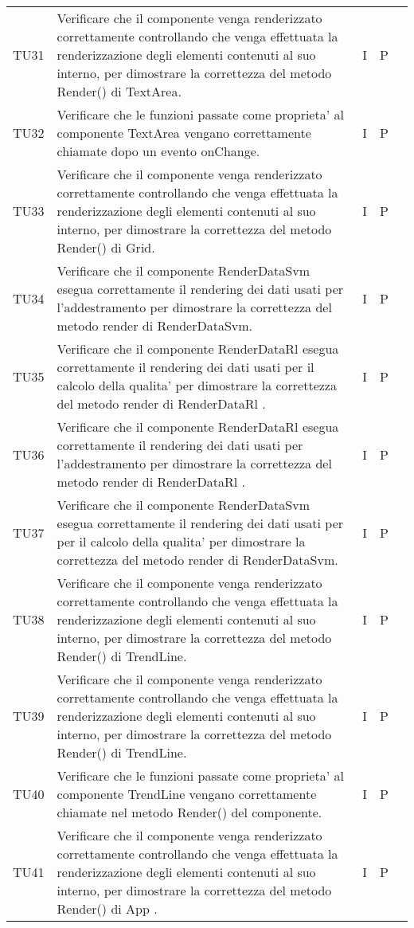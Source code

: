 \begin{longtable} {
		>{}p{15mm} 
		>{}p{79.5mm}
		>{}p{15mm} 
		>{}p{15mm}
		>{}p{0mm}}
	TU31		& Verificare che il componente venga renderizzato correttamente controllando che venga effettuata la renderizzazione degli elementi contenuti al suo interno, per dimostrare la correttezza del metodo Render() di  TextArea.& I & P &\TBstrut \\ [2mm]	
	TU32		& Verificare che le funzioni passate come proprieta' al componente TextArea vengano correttamente chiamate dopo un evento onChange.& I & P &\TBstrut \\ [2mm]	
	TU33		& Verificare che il componente venga renderizzato correttamente controllando che venga effettuata la renderizzazione degli elementi contenuti al suo interno, per dimostrare la correttezza del metodo Render() di  Grid.& I & P &\TBstrut \\ [2mm]	
	TU34		& Verificare che il componente RenderDataSvm esegua correttamente il rendering dei dati usati per l'addestramento per dimostrare la correttezza del metodo render di RenderDataSvm.& I & P &\TBstrut \\ [2mm]
	TU35		& Verificare che il componente RenderDataRl esegua correttamente il rendering dei dati usati per il calcolo della qualita' per dimostrare la correttezza del metodo render di RenderDataRl .& I & P &\TBstrut \\ [2mm]
	TU36		& Verificare che il componente RenderDataRl esegua correttamente il rendering dei dati usati per l'addestramento per dimostrare la correttezza del metodo render di RenderDataRl .& I & P &\TBstrut \\ [2mm]
	TU37		& Verificare che il componente RenderDataSvm esegua correttamente il rendering dei dati usati per per il calcolo della qualita' per dimostrare la correttezza del metodo render di RenderDataSvm.& I & P &\TBstrut \\ [2mm]
	TU38		& Verificare che il componente venga renderizzato correttamente controllando che venga effettuata la renderizzazione degli elementi contenuti al suo interno, per dimostrare la correttezza del metodo Render() di  TrendLine.& I & P &\TBstrut \\ [2mm]
	TU39		& Verificare che il componente venga renderizzato correttamente controllando che venga effettuata la renderizzazione degli elementi contenuti al suo interno, per dimostrare la correttezza del metodo Render() di  TrendLine.& I & P &\TBstrut \\ [2mm]
	TU40		& Verificare che le funzioni passate come proprieta' al componente TrendLine vengano correttamente chiamate nel metodo Render() del componente.& I & P &\TBstrut \\ [2mm]
	TU41		& Verificare che il componente venga renderizzato correttamente controllando che venga effettuata la renderizzazione degli elementi contenuti al suo interno, per dimostrare la correttezza del metodo Render() di  App .& I & P &\TBstrut \\ [2mm]
	

\end{longtable}
